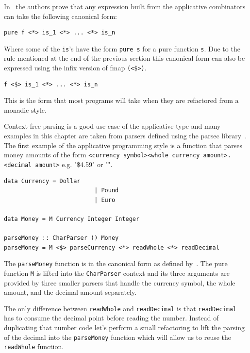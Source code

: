 In~\citep{mcbrideIdioms} the authors prove that any expression built from the applicative combinators can take the following canonical form:

\begin{lstlisting}[frame=tblr]
pure f <*> is_1 <*> ... <*> is_n
\end{lstlisting}


Where some of the \texttt{is}'s have the form \texttt{pure s} for a pure function \texttt{s}. Due to the rule mentioned at the end of the previous section this canonical form can also be expressed using the infix version of fmap \texttt{(<\$>)}. 

\begin{lstlisting}[frame=tblr]
f <$> is_1 <*> ... <*> is_n
\end{lstlisting}

This is the form that most programs will take when they are refactored from a monadic style. 


 Context-free parsing is a good use case of the applicative type and many examples in this chapter are taken from parsers defined using the parsec library~\citep{parsec}. The first example of the applicative programming style is a function that parses money amounts of the form \texttt{<currency symbol><whole currency amount>.<decimal amount>} e.g. "\$4.59" or "".
 
 \begin{lstlisting}[frame=tblr]
 data Currency = Dollar
                          | Pound
                          | Euro
              
data Money = M Currency Integer Integer

parseMoney :: CharParser () Money
parseMoney = M <$> parseCurrency <*> readWhole <*> readDecimal
 \end{lstlisting}
 
The \texttt{parseMoney} function is in the canonical form as defined by~\citep{mcbrideIdioms}. The pure function \texttt{M} is lifted into the \texttt{CharParser} context and its three arguments are provided by three smaller parsers that handle the currency symbol, the whole amount, and the decimal amount separately. 

The only difference between \texttt{readWhole} and \texttt{readDecimal} is that \texttt{readDecimal} has to consume the decimal point before reading the number. Instead of duplicating that number code let's perform a small refactoring to lift the parsing of the decimal into the \texttt{parseMoney} function which will allow us to reuse the \texttt{readWhole} function.

